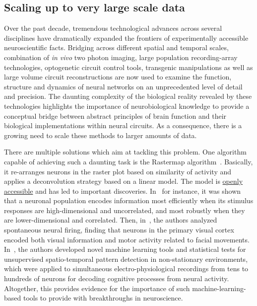 \documentclass[brainsci, %
               review,submit,pdftex,moreauthors
               ]{Definitions/mdpi}
\begin{document}
\subsection{Scaling up to very large scale data}
Over the past decade, tremendous technological advances across several disciplines have dramatically expanded the frontiers of experimentally accessible neuroscientific facts. Bridging across different spatial and temporal scales, combination of \textit{in vivo} two photon imaging, large population recording-array technologies, optogenetic circuit control tools, transgenic manipulations as well as large volume circuit reconstructions are now used to examine the function, structure and dynamics of neural networks on an unprecedented level of detail and precision. The daunting complexity of the biological reality revealed by these technologies highlights the importance of neurobiological knowledge to provide a conceptual bridge between abstract principles of brain function and their biological implementations within neural circuits. As a consequence, there is a growing need to scale these methods to larger amounts of data. 

There are multiple solutions which aim at tackling this problem. One algorithm capable of achieving such a daunting task is the Rastermap algorithm~\citep{pachitariu_robustness_2018}. Basically, it re-arranges neurons in the raster plot based on similarity of activity and applies a deconvolution strategy based on a linear model. The model is \href{https://github.com/MouseLand/rastermap}{openly accessible} and has led to important discoveries. In~\citet{stringer_spontaneous_2019,stringer_high-dimensional_2019} for instance, it was shown that a neuronal population encodes information most efficiently when its stimulus responses are high-dimensional and uncorrelated, and most robustly when they are lower-dimensional and correlated. Then, in~\citep{stringer_high-precision_2021}, the authors analyzed spontaneous neural firing, finding that neurons in the primary visual cortex encoded both visual information and motor activity related to facial movements. In~\citep{russo_cell_2017}, the authors developed novel machine learning tools and statistical tests for unsupervised spatio-temporal pattern detection in non-stationary environments, which were applied to simultaneous electro-physiological recordings from tens to hundreds of neurons for decoding cognitive processes from neural activity. Altogether, this provides evidence for the importance of such machine-learning-based tools to provide with breakthroughs in neuroscience.
\end{document}
